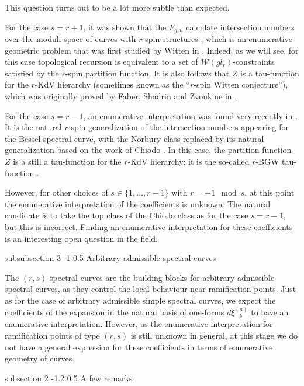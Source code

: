 \documentclass[reqno,oneside,11pt]{amsart}
\makeatletter
\theoremstyle{plain}
\theoremstyle{definition}
\theoremstyle{remark}
\numberwithin{equation}{section}
\renewcommand{\subsection}{\@startsection
{subsection}%
{2}%
{\z@}%
{-1.2\baselineskip}%
{0.5\baselineskip}%
{\normalfont \bf \normalsize}} %
\renewcommand{\subsubsection}{\@startsection
{subsubsection}%
{3}%
{\z@}%
{-1\baselineskip}%
{0.5\baselineskip}%
{\normalfont \it \normalsize}} %
\makeatother
\begin{document}
This question turns out to be a lot more subtle than expected. 

For the case $s=r+1$, it was shown that the $F_{g,n}$ calculate intersection numbers over the moduli space of curves with $r$-spin structures \cite{BE17,DNOPS15}, which is an enumerative geometric problem that was first studied by Witten in \cite{Wi93}. Indeed, as we will see, for this case topological recursion is equivalent to a set of $\mathcal{W}(gl_r)$-constraints satisfied by the $r$-spin partition function. It is also follows that $Z$ is a tau-function for the $r$-KdV hierarchy (sometimes known as the ``$r$-spin Witten conjecture''), which was originally proved by Faber, Shadrin and Zvonkine in \cite{FSZ06}.

For the case $s=r-1$, an enumerative interpretation was found very recently in \cite{CGG22}. It is the natural $r$-spin generalization of the intersection numbers appearing for the Bessel spectral curve, with the Norbury class replaced by its natural generalization based on the work of Chiodo \cite{Ch06}. In this case, the partition function $Z$ is a still a tau-function for the $r$-KdV hierarchy; it is the so-called $r$-BGW tau-function \cite{ABDKS23b}.

However, for other choices of $s \in \{1,\ldots, r-1\}$ with $r = \pm 1 \mod s$, at this point the enumerative interpretation of the coefficients is unknown. The natural candidate is to take the top class of the Chiodo class as for the case $s=r-1$, but this is incorrect. Finding an enumerative interpretation for these coefficients is an interesting open question in the field.

\subsubsection{Arbitrary admissible spectral curves}

The $(r,s)$ spectral curves are the building blocks for arbitrary admissible spectral curves, as they control the local behaviour near ramification points. Just as for the case of arbitrary admissible simple spectral curves, we expect the coefficients of the expansion in the natural basis of one-forms $d \xi_{-k}^{(a)}$ to have an enumerative interpretation. However, as the enumerative interpretation for ramification points of type $(r,s)$ is still unknown in general, at this stage we do not have a general expression for these coefficients in terms of enumerative geometry of curves.


\subsection{A few remarks}
\end{document}
